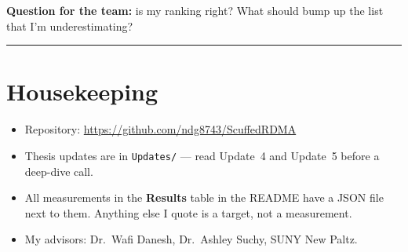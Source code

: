 \documentclass[11pt]{article}
\begin{document}
\textbf{Question for the team:} is my ranking right? What should
bump up the list that I'm underestimating?

\vspace{8pt}
\hrule
\vspace{6pt}

\section*{Housekeeping}

\begin{itemize}
\item Repository: \url{https://github.com/ndg8743/ScuffedRDMA}
\item Thesis updates are in \texttt{Updates/} --- read Update~4 and
Update~5 before a deep-dive call.
\item All measurements in the \textbf{Results} table in the README have
a JSON file next to them. Anything else I quote is a target, not a
measurement.
\item My advisors: Dr.\ Wafi Danesh, Dr.\ Ashley Suchy, SUNY New
Paltz.
\end{itemize}
\end{document}

